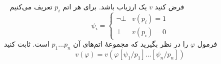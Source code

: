 ~
فرض کنید $v$ یک ارزیاب باشد. برای هر اتم $p_i$ تعریف می‌کنیم
\[ \psi_i =
\begin{cases}
  \neg \bot & v(p_i) = 1\\
  \bot & v(p_i) = 0
\end{cases}
\]
فرمول $\varphi$ را در نظر بگیرید که مجموعهٔ اتم‌های آن $p_1 \dots p_n$ است. ثابت کنید
\[ v(\varphi) = v(\varphi[\psi_1/p_1]\dots[\psi_n/p_n]) \]